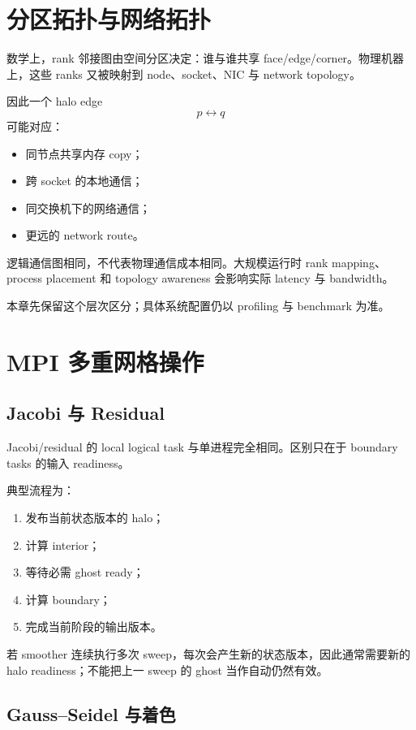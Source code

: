 \section{分区拓扑与网络拓扑}

数学上，rank 邻接图由空间分区决定：谁与谁共享 face/edge/corner。物理机器上，这些 ranks 又被映射到 node、socket、NIC 与 network topology。

因此一个 halo edge
\begin{equation}
p\leftrightarrow q
\end{equation}
可能对应：
\begin{itemize}
\item 同节点共享内存 copy；
\item 跨 socket 的本地通信；
\item 同交换机下的网络通信；
\item 更远的 network route。
\end{itemize}

逻辑通信图相同，不代表物理通信成本相同。大规模运行时 rank mapping、process placement 和 topology awareness 会影响实际 latency 与 bandwidth。

本章先保留这个层次区分；具体系统配置仍以 profiling 与 benchmark 为准。

\section{MPI 多重网格操作}

\subsection{Jacobi 与 Residual}

Jacobi/residual 的 local logical task 与单进程完全相同。区别只在于 boundary tasks 的输入 readiness。

典型流程为：
\begin{enumerate}
\item 发布当前状态版本的 halo；
\item 计算 interior；
\item 等待必需 ghost ready；
\item 计算 boundary；
\item 完成当前阶段的输出版本。
\end{enumerate}

若 smoother 连续执行多次 sweep，每次会产生新的状态版本，因此通常需要新的 halo readiness；不能把上一 sweep 的 ghost 当作自动仍然有效。

\subsection{Gauss--Seidel 与着色}

